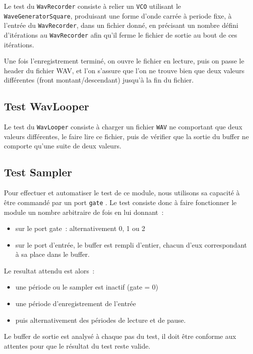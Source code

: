 Le test du \verb!WavRecorder! consiste à relier un \verb!VCO!
utilisant le \verb!WaveGeneratorSquare!, produisant une forme
d'onde carrée à periode fixe, à l'entrée du \verb!WavRecorder!,
dans un fichier donné, en précisant un nombre défini d'itérations
au \verb!WavRecorder! afin qu'il ferme le fichier de sortie au bout
de ces itérations.

Une fois l'enregistrement terminé, on ouvre le fichier en lecture,
puis on passe le header du fichier WAV, et l'on s'assure que l'on
ne trouve bien que deux valeurs différentes (front
montant/descendant) jusqu'à la fin du fichier.

\subsection{Test WavLooper}

Le test du \verb!WavLooper! consiste à charger un fichier
\verb!WAV! ne comportant que deux valeurs différentes, le faire
lire ce fichier, puis de vérifier que la sortie du buffer ne
comporte qu'une suite de deux valeurs.

\subsection{Test Sampler}
Pour effectuer et automatiser le test de ce module, nous utilisons sa capacité à être commandé par un port \texttt{gate}
. Le test consiste donc à faire fonctionner le module un nombre arbitraire de fois en lui donnant~: 
\begin{itemize}
    \item sur le port gate~: alternativement 0, 1 ou 2
    \item sur le port d'entrée, le buffer est rempli d'entier, chacun d'eux correspondant à sa place dans le buffer.
\end{itemize}
Le resultat attendu est alors~:
\begin{itemize}
    \item une période ou le sampler est inactif (gate = 0)
    \item une période d'enregistrement de l'entrée
    \item puis alternativement des périodes de lecture et de pause.
\end{itemize}

Le buffer de sortie est analysé à chaque pas du test, il doit être conforme aux attentes pour que le résultat du test reste valide.
